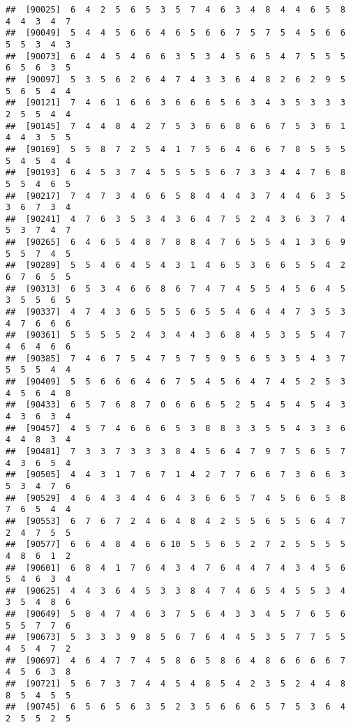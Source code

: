 \documentclass[
]{book}
\begin{document}
\begin{verbatim}
##  [90025]  6  4  2  5  6  5  3  5  7  4  6  3  4  8  4  4  6  5  8  4  4  3  4  7
##  [90049]  5  4  4  5  6  6  4  6  5  6  6  7  5  7  5  4  5  6  6  5  5  3  4  3
##  [90073]  6  4  4  5  4  6  6  3  5  3  4  5  6  5  4  7  5  5  5  6  5  6  3  5
##  [90097]  5  3  5  6  2  6  4  7  4  3  3  6  4  8  2  6  2  9  5  5  6  5  4  4
##  [90121]  7  4  6  1  6  6  3  6  6  6  5  6  3  4  3  5  3  3  3  2  5  5  4  4
##  [90145]  7  4  4  8  4  2  7  5  3  6  6  8  6  6  7  5  3  6  1  4  4  3  5  5
##  [90169]  5  5  8  7  2  5  4  1  7  5  6  4  6  6  7  8  5  5  5  5  4  5  4  4
##  [90193]  6  4  5  3  7  4  5  5  5  5  6  7  3  3  4  4  7  6  8  5  5  4  6  5
##  [90217]  7  4  7  3  4  6  6  5  8  4  4  4  3  7  4  4  6  3  5  3  6  7  3  4
##  [90241]  4  7  6  3  5  3  4  3  6  4  7  5  2  4  3  6  3  7  4  5  3  7  4  7
##  [90265]  6  4  6  5  4  8  7  8  8  4  7  6  5  5  4  1  3  6  9  5  5  7  4  5
##  [90289]  5  5  4  6  4  5  4  3  1  4  6  5  3  6  6  5  5  4  2  6  7  6  5  5
##  [90313]  6  5  3  4  6  6  8  6  7  4  7  4  5  5  4  5  6  4  5  3  5  5  6  5
##  [90337]  4  7  4  3  6  5  5  5  6  5  5  4  6  4  4  7  3  5  3  4  7  6  6  6
##  [90361]  5  5  5  5  2  4  3  4  4  3  6  8  4  5  3  5  5  4  7  4  6  4  6  6
##  [90385]  7  4  6  7  5  4  7  5  7  5  9  5  6  5  3  5  4  3  7  5  5  5  4  4
##  [90409]  5  5  6  6  6  4  6  7  5  4  5  6  4  7  4  5  2  5  3  4  5  6  4  8
##  [90433]  6  5  7  6  8  7  0  6  6  6  5  2  5  4  5  4  5  4  3  4  3  6  3  4
##  [90457]  4  5  7  4  6  6  6  5  3  8  8  3  3  5  5  4  3  3  6  4  4  8  3  4
##  [90481]  7  3  3  7  3  3  3  8  4  5  6  4  7  9  7  5  6  5  7  4  3  6  5  4
##  [90505]  4  4  3  1  7  6  7  1  4  2  7  7  6  6  7  3  6  6  3  5  3  4  7  6
##  [90529]  4  6  4  3  4  4  6  4  3  6  6  5  7  4  5  6  6  5  8  7  6  5  4  4
##  [90553]  6  7  6  7  2  4  6  4  8  4  2  5  5  6  5  5  6  4  7  2  4  7  5  5
##  [90577]  6  6  4  8  4  6  6 10  5  5  6  5  2  7  2  5  5  5  5  4  8  6  1  2
##  [90601]  6  8  4  1  7  6  4  3  4  7  6  4  4  7  4  3  4  5  6  5  4  6  3  4
##  [90625]  4  4  3  6  4  5  3  3  8  4  7  4  6  5  4  5  5  3  4  3  5  4  8  6
##  [90649]  5  8  4  7  4  6  3  7  5  6  4  3  3  4  5  7  6  5  6  5  5  7  7  6
##  [90673]  5  3  3  3  9  8  5  6  7  6  4  4  5  3  5  7  7  5  5  4  5  4  7  2
##  [90697]  4  6  4  7  7  4  5  8  6  5  8  6  4  8  6  6  6  6  7  4  5  6  3  8
##  [90721]  5  6  7  3  7  4  4  5  4  8  5  4  2  3  5  2  4  4  8  8  5  4  5  5
##  [90745]  6  5  6  5  6  3  5  2  3  5  6  6  6  5  7  5  3  6  4  2  5  5  2  5

\end{verbatim}
\end{document}

